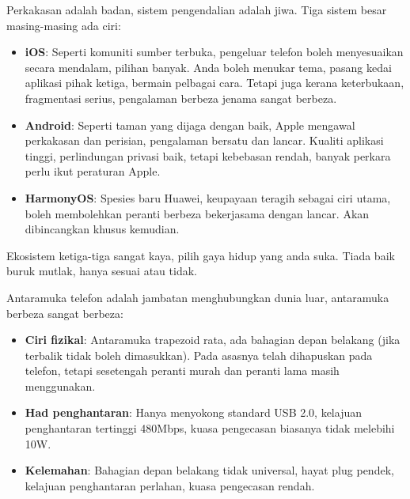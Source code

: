 
Perkakasan adalah badan, sistem pengendalian adalah jiwa. Tiga sistem besar masing-masing ada ciri:

\begin{itemize}
  \item \textbf{iOS}: Seperti komuniti sumber terbuka, pengeluar telefon boleh menyesuaikan secara mendalam, pilihan banyak. Anda boleh menukar tema, pasang kedai aplikasi pihak ketiga, bermain pelbagai cara. Tetapi juga kerana keterbukaan, fragmentasi serius, pengalaman berbeza jenama sangat berbeza.
  \item \textbf{Android}: Seperti taman yang dijaga dengan baik, Apple mengawal perkakasan dan perisian, pengalaman bersatu dan lancar. Kualiti aplikasi tinggi, perlindungan privasi baik, tetapi kebebasan rendah, banyak perkara perlu ikut peraturan Apple.
  \item \textbf{HarmonyOS}: Spesies baru Huawei, keupayaan teragih sebagai ciri utama, boleh membolehkan peranti berbeza bekerjasama dengan lancar. Akan dibincangkan khusus kemudian.
\end{itemize}

Ekosistem ketiga-tiga sangat kaya, pilih gaya hidup yang anda suka. Tiada baik buruk mutlak, hanya sesuai atau tidak.


Antaramuka telefon adalah jambatan menghubungkan dunia luar, antaramuka berbeza sangat berbeza:


\begin{itemize}
  \item \textbf{Ciri fizikal}: Antaramuka trapezoid rata, ada bahagian depan belakang (jika terbalik tidak boleh dimasukkan). Pada asasnya telah dihapuskan pada telefon, tetapi sesetengah peranti murah dan peranti lama masih menggunakan.
  \item \textbf{Had penghantaran}: Hanya menyokong standard USB 2.0, kelajuan penghantaran tertinggi 480Mbps, kuasa pengecasan biasanya tidak melebihi 10W.
  \item \textbf{Kelemahan}: Bahagian depan belakang tidak universal, hayat plug pendek, kelajuan penghantaran perlahan, kuasa pengecasan rendah.
\end{itemize}


